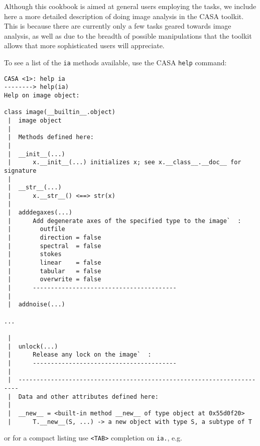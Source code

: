 Although this cookbook is aimed at general users employing the
tasks, we include here a more detailed description of doing
image analysis in the CASA toolkit.  This is because
there are currently only a few tasks geared towards image analysis,
as well as due to the breadth of possible manipulations that the
toolkit allows that more sophisticated users will appreciate.

To see a list of the {\tt ia} methods available, use the 
CASA {\tt help} command:
\footnotesize
\begin{verbatim}
CASA <1>: help ia 
--------> help(ia)
Help on image object:

class image(__builtin__.object)
 |  image object
 |  
 |  Methods defined here:
 |  
 |  __init__(...)
 |      x.__init__(...) initializes x; see x.__class__.__doc__ for signature
 |  
 |  __str__(...)
 |      x.__str__() <==> str(x)
 |  
 |  adddegaxes(...)
 |      Add degenerate axes of the specified type to the image`  : 
 |        outfile
 |        direction = false
 |        spectral  = false
 |        stokes
 |        linear    = false
 |        tabular   = false
 |        overwrite = false
 |      ----------------------------------------
 |  
 |  addnoise(...)

...

 |  
 |  unlock(...)
 |      Release any lock on the image`  : 
 |      ----------------------------------------
 |  
 |  ----------------------------------------------------------------------
 |  Data and other attributes defined here:
 |  
 |  __new__ = <built-in method __new__ of type object at 0x55d0f20>
 |      T.__new__(S, ...) -> a new object with type S, a subtype of T

\end{verbatim}
\normalsize
or for a compact listing use {\tt <TAB>} completion on {\tt ia.},
e.g.
\small
